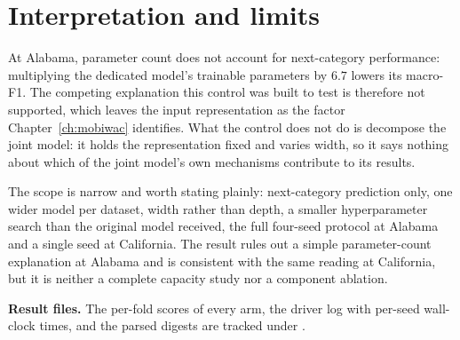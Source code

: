\section{Interpretation and limits}
\label{sec:apx-parameter-result}

At Alabama, parameter count does not account for next-category performance: multiplying the
dedicated model's trainable parameters by $6.7$ lowers its macro-F1. The competing explanation this
control was built to test is therefore not supported, which leaves the input representation as the
factor Chapter~\ref{ch:mobiwac} identifies. What the control does not do is decompose the joint
model: it holds the representation fixed and varies width, so it says nothing about which of the
joint model's own mechanisms contribute to its results.

The scope is narrow and worth stating plainly: next-category prediction only, one wider model per
dataset, width rather than depth, a smaller hyperparameter search than the original model received,
the full four-seed protocol at Alabama and a single seed at California. The result rules out a
simple parameter-count explanation at Alabama and is consistent with the same reading at
California, but it is neither a complete capacity study nor a component ablation.

\noindent\textbf{Result files.} The per-fold scores of every arm, the driver log with per-seed
wall-clock times, and the parsed digests are tracked under
.
